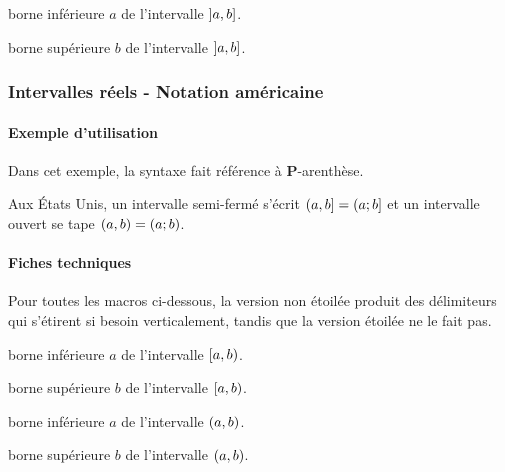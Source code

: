 \documentclass[12pt,a4paper]{article}
\theoremstyle{definition}
\begin{document}


 borne inférieure $a$ de l'intervalle $\intervalOC{a}{b}$.

 borne supérieure $b$ de l'intervalle $\intervalOC{a}{b}$.




\subsubsection{Intervalles réels - Notation américaine}

\paragraph{Exemple d'utilisation}

Dans cet exemple, la syntaxe fait référence à \textbf{P}-arenthèse.

\begin{tcblisting}{}
Aux États Unis, un intervalle semi-fermé s'écrit $\intervalPC{a}{b} = (a ; b]$ et
un intervalle ouvert se tape $\intervalP{a}{b} = (a ; b)$.
\end{tcblisting}


\paragraph{Fiches techniques}

Pour toutes les macros ci-dessous, la version non étoilée produit des délimiteurs qui s'étirent si besoin verticalement, tandis que la version étoilée ne le fait pas.


\bigskip





 borne inférieure $a$ de l'intervalle $\intervalCP{a}{b}$.

 borne supérieure $b$ de l'intervalle $\intervalCP{a}{b}$.


\bigskip




 borne inférieure $a$ de l'intervalle $\intervalP{a}{b}$.

 borne supérieure $b$ de l'intervalle $\intervalP{a}{b}$.
\end{document}

